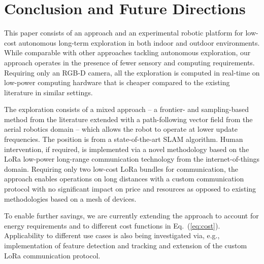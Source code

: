 \documentclass[letterpaper,10pt,conference,twoside]{IEEEtran}
\theoremstyle{definition}
\begin{document}
\section{Conclusion and Future Directions}
\label{sec:cf}
\noindent
This paper consists of an %
approach and an experimental robotic platform 
for low-cost autonomous long-term exploration in both indoor and outdoor %
environments. While comparable with other %
approaches tackling autonomous exploration, %
our approach %
operates in the presence of fewer sensory and computing requirements. Requiring only an RGB-D camera, all the exploration is computed in real-time on low-power computing hardware that is cheaper compared to the existing literature %
in similar settings.%

The exploration consists of %
a %
mixed approach -- a frontier- and sampling-based method from the literature 
extended with a path-following vector field %
from the aerial robotics domain 
-- which allows the robot to operate at lower update frequencies. The position is from a state-of-the-art SLAM algorithm. %
Human intervention, if required, is implemented via a novel methodology based on the LoRa low-power long-range communication technology %
from the internet-of-things domain. 
Requiring only two low-cost LoRa bundles for communication, the approach enables operations on long distances with a custom communication protocol with no significant impact on price and resources as opposed to existing methodologies based on a mesh of devices. %

To enable further savings, we are currently extending the approach to account for energy requirements and to %
different cost functions in Eq.~(\ref{eq:cost}). Applicability to different use cases is also being investigated via, e.g., implementation of feature detection and tracking and extension of the custom LoRa communication protocol. %
\end{document}
